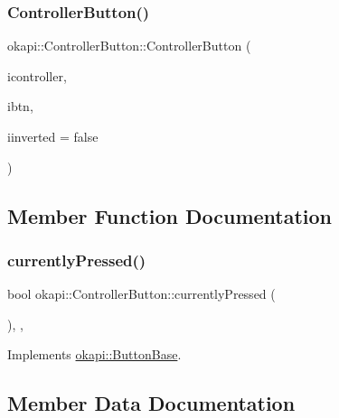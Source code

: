 \subsubsection{\texorpdfstring{ControllerButton()}{ControllerButton()}\hspace{0.1cm}{\footnotesize\ttfamily [2/2]}}
{\footnotesize\ttfamily okapi\+::\+Controller\+Button\+::\+Controller\+Button (\begin{DoxyParamCaption}\item[{\mbox{\hyperlink{namespaceokapi_a56349a0562b06c6ffc742e94cb1e4361}{Controller\+Id}}}]{icontroller,  }\item[{\mbox{\hyperlink{namespaceokapi_af5040b3f1f33d27698871423e1453ab6}{Controller\+Digital}}}]{ibtn,  }\item[{bool}]{iinverted = {\ttfamily false} }\end{DoxyParamCaption})}



\subsection{Member Function Documentation}
\mbox{\label{classokapi_1_1ControllerButton_a35ee73925d03c31b19568530248c0892}} 
\subsubsection{\texorpdfstring{currentlyPressed()}{currentlyPressed()}}
{\footnotesize\ttfamily bool okapi\+::\+Controller\+Button\+::currently\+Pressed (\begin{DoxyParamCaption}{ }\end{DoxyParamCaption})\hspace{0.3cm}{\ttfamily [override]}, {\ttfamily [protected]}, {\ttfamily [virtual]}}



Implements \mbox{\hyperlink{classokapi_1_1ButtonBase_a748b6f2b5ebce9fa9f6bbc9d170d3d7a}{okapi\+::\+Button\+Base}}.



\subsection{Member Data Documentation}
\mbox{\label{classokapi_1_1ControllerButton_a1839a778e3a25b7cfcd954e733f74321}} 
